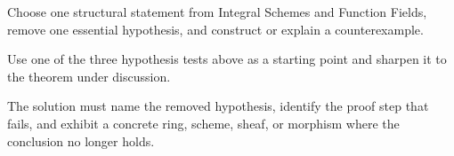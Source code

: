 \begin{exercise}\label{exr:vi27-expand-16}
Choose one structural statement from Integral Schemes and Function Fields, remove one essential hypothesis, and construct or explain a counterexample.
\end{exercise}
\begin{hint}
Use one of the three hypothesis tests above as a starting point and sharpen it to the theorem under discussion.
\end{hint}
\begin{solution}
The solution must name the removed hypothesis, identify the proof step that fails, and exhibit a concrete ring, scheme, sheaf, or morphism where the conclusion no longer holds.
\end{solution}

